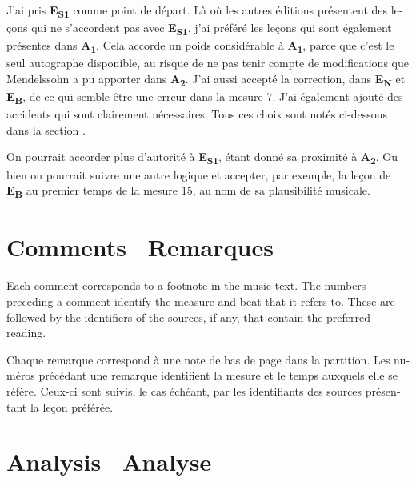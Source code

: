 \documentclass[a4paper, 12pt]{book}
\newcommand{\source}[2]{\textbf{#1\textsubscript{#2}}}
\newcommand{\bigdot}[0]{{\Large \textbullet}}
\newcommand{\centerbigdot}[0]{\begin{center}\bigdot\end{center}}
\begin{document}
{\begin{otherlanguage}{french}
    J'ai pris \source{E}{S1} comme point de départ. Là où les autres
    éditions présentent des leçons qui ne s'accordent pas avec
    \source{E}{S1}, j'ai préféré les leçons qui sont également
    présentes dans \source{A}{1}. Cela accorde un poids considérable
    à \source{A}{1}, parce que c'est le seul autographe disponible, au
    risque de ne pas tenir compte de modifications que Mendelssohn a
    pu apporter dans \source{A}{2}.  J'ai aussi accepté la correction,
    dans \source{E}{N} et \source{E}{B}, de ce qui semble être une
    erreur dans la mesure 7. J'ai également ajouté des accidents qui
    sont clairement nécessaires. Tous ces choix sont notés ci-dessous
    dans la section .

    On pourrait accorder plus d'autorité à \source{E}{S1}, étant donné
    sa proximité à \source{A}{2}. Ou bien on pourrait suivre une autre
    logique et accepter, par exemple, la leçon de \source{E}{B} au
    premier temps de la mesure 15, au nom de sa plausibilité musicale.
    \end{otherlanguage}
    
    \section*{Comments \bigdot\ \foreignlanguage{french}{Remarques}}
    \label{sec:comments}

    Each comment corresponds to a footnote in the music text. The
    numbers preceding a comment identify the measure and beat that
    it refers to.  These are followed by the identifiers of the
    sources, if any, that contain the preferred reading.
    
    \centerbigdot

    \begin{otherlanguage}{french}
      Chaque remarque correspond à une note de bas de page dans la
      partition. Les numéros précédant une remarque identifient la
      mesure et le temps auxquels elle se réfère. Ceux-ci sont suivis,
      le cas échéant, par les identifiants des sources présentant la
      leçon préférée.
    \end{otherlanguage}

    

    \section*{Analysis \bigdot\ \foreignlanguage{french}{Analyse}}
    \label{sec:analysis}

}
\end{document}
